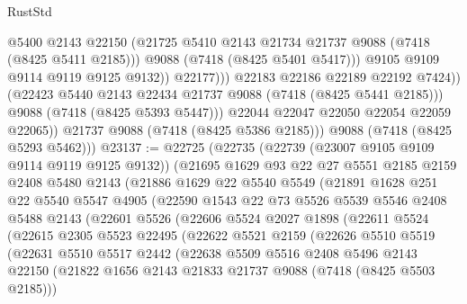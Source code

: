\begin{lexlean}{RustStd}
\begin{coremodule}
                              @5400
                              @2143
                              @22150
                              (@21725 @5410 @2143 @21734 @21737 @9088 (@7418 (@8425 @5411 @2185)))
                              @9088
                              (@7418 (@8425 @5401 @5417)))
                            @9105
                            @9109
                            @9114
                            @9119
                            @9125
                            @9132))
                        @22177)))
                  @22183
                  @22186
                  @22189
                  @22192
                  @7424))
              (@22423 @5440 @2143 @22434 @21737 @9088 (@7418 (@8425 @5441 @2185)))
              @9088
              (@7418 (@8425 @5393 @5447)))
            @22044
            @22047
            @22050
            @22054
            @22059
            @22065))
        @21737
        @9088
        (@7418 (@8425 @5386 @2185)))
      @9088
      (@7418 (@8425 @5293 @5462)))
@23137 := @22725
    (@22735
      (@22739 (@23007 @9105 @9109 @9114 @9119 @9125 @9132))
      (@21695
        @1629
        @93
        @22
        @27
        @5551
        @2185
        @2159
        @2408
        @5480
        @2143
        (@21886
          @1629
          @22
          @5540
          @5549
          (@21891
            @1628
            @251
            @22
            @5540
            @5547
            @4905
            (@22590
              @1543
              @22
              @73
              @5526
              @5539
              @5546
              @2408
              @5488
              @2143
              (@22601
                @5526
                (@22606
                  @5524
                  @2027
                  @1898
                  (@22611
                    @5524
                    (@22615
                      @2305
                      @5523
                      @22495
                      (@22622
                        @5521
                        @2159
                        (@22626
                          @5510
                          @5519
                          (@22631
                            @5510
                            @5517
                            @2442
                            (@22638
                              @5509
                              @5516
                              @2408
                              @5496
                              @2143
                              @22150
                              (@21822 @1656 @2143 @21833 @21737 @9088 (@7418 (@8425 @5503 @2185)))

\end{coremodule}
\end{lexlean}

